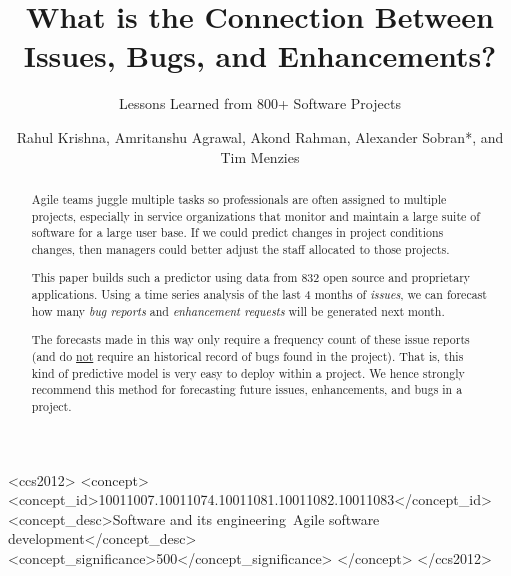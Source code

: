 \documentclass[sigconf, preprint]{acmart}
\begin{document}
\title{What is the Connection Between Issues, Bugs, and Enhancements?}
\subtitle{Lessons Learned
    from
    800+ Software Projects}
\author{
Rahul Krishna, Amritanshu Agrawal, Akond Rahman, 
Alexander Sobran*, and Tim Menzies}






\begin{abstract}
Agile teams juggle multiple tasks so professionals are often assigned to multiple projects, especially in service organizations that monitor and maintain a large suite of software for a large user base. 
If we could predict changes in
project conditions
changes, then managers could  better adjust the
staff allocated to those projects.

This paper builds such a predictor using data from  832  open source and 
proprietary applications. Using a time series analysis of the   last 4 months
of {\em issues}, we can forecast how many {\em bug reports} and \textit{enhancement requests} will be generated  next month. 

The forecasts made in this way only require a frequency count of these issue 
reports  (and do \underline{not} require an historical record of bugs found in 
the project). That is, this kind of predictive model is very easy to deploy 
within a project. We hence strongly recommend this method for forecasting 
future issues, enhancements, and bugs in a project. 
\end{abstract}




\begin{CCSXML}
<ccs2012>
<concept>
<concept_id>10011007.10011074.10011081.10011082.10011083</concept_id>
<concept_desc>Software and its engineering~Agile software 
development</concept_desc>
<concept_significance>500</concept_significance>
</concept>
</ccs2012>
\end{CCSXML}



\end{document}
